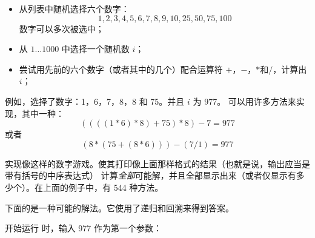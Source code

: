 \begin{Exercise}[title={数字游戏},difficulty=9]
\label{ex:numbercruncher}
\begin{itemize}
\item{从列表中随机选择六个数字：
$$1, 2, 3, 4, 5, 6, 7, 8, 9, 10, 25, 50, 75, 100$$
数字可以多次被选中；}
\item{从 $1 \ldots 1000$ 中选择一个随机数 $i$；}
\item{尝试用先前的六个数字（或者其中的几个）配合运算符 $+$，$-$，$*$和$/$，计算出 $i$；}
\end{itemize}
例如，选择了数字：1，6，7，8，8 和 75。并且 $i$ 为 977。
可以用许多方法来实现，其中一种：
$$ ((((1 * 6) * 8) + 75) * 8) - 7 = 977$$ 
或者
$$ (8*(75+(8*6)))-(7/1) = 977$$

\Question\label{ex:cruncher q1}
实现像这样的数字游戏。使其打印像上面那样格式的结果（也就是说，输出应当是带有括号的中序表达式）
\Question\label{ex:cruncher q2}
计算\emph{全部}可能解，并且全部显示出来（或者仅显示有多少个）。在上面的例子中，有 544 种方法。
\end{Exercise}

\begin{Answer}
\Question 
下面的是一种可能的解法。它使用了递归和回溯来得到答案。


\Question
开始运行  时，输入 977 作为第一个参数：
\vspace{1em}

\end{Answer}
